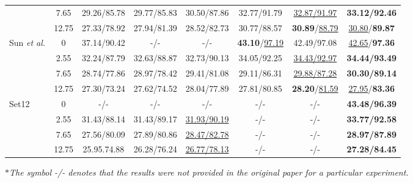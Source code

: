 \documentclass[10pt,journal,compsoc]{IEEEtran}
\newcommand\bdr[1]{{\textbf{#1}}}
\newcommand\bdb[1]{{\underline{#1}}}
\begin{document}
\begin{table}[t!]
\begin{tiny}
\begin{center}
\begin{tabular}{l c cccccc}
& 7.65 & 29.26/85.78  & 29.77/85.83 & 30.50/87.86 & 32.77/91.79 & \bdb{32.87/91.97} & \bdr{33.12/92.46} \\

& 12.75 & 27.33/78.92 & 27.94/81.39 & 28.52/82.73 & 30.77/88.57 & \bdr{30.89}/\bdb{88.79} & \bdb{30.80}/\bdr{89.87} \\

\hline


\multirow{4}{*}{Sun \textit{et al.}}

& 0    &  37.14/90.42  & -/- & -/- & \bdr{43.10}/\bdb{97.19}     & 42.49/97.08 &  \bdb{42.65}/\bdr{97.36} \\

& 2.55 & 32.24/87.79  & 32.63/88.87 & 32.73/90.13 & 34.05/92.25 & \bdb{34.43/92.97} & \bdr{34.44/93.49} \\

& 7.65 & 28.74/77.86  & 28.97/78.42 & 29.41/81.08 & 29.11/86.31     & \bdb{29.88/87.28} & \bdr{30.30/89.14} \\

& 12.75 & 27.30/73.24 & 27.62/74.52 & 28.04/77.89 & 27.81/80.85     & \bdr{28.20}/\bdb{81.59} & \bdb{27.95}/\bdr{83.36} \\

\hline


\multirow{4}{*}{Set12}

& 0     & -/-  & -/-  & -/-  & -/-  & -/-  &  \bdr{43.48/96.39} \\

& 2.55  & 31.43/88.14 & 31.43/89.17 & \bdb{31.93/90.19}  & -/-  & -/-  & \bdr{33.77/92.58}  \\

& 7.65  & 27.56/80.09 & 27.89/80.86 & \bdb{28.47/82.78} & -/-  & -/-  & \bdr{28.97/87.89} \\

& 12.75 & 25.95.74.88 & 26.28/76.24 & \bdb{26.77/78.13} & -/-  & -/-  & \bdr{27.28/84.45} \\

\hline


\end{tabular}\end{center}
\end{tiny}
\textit{$\ast$The symbol -/- denotes that the results were not provided in the original paper for a particular experiment.}
\end{table}
\end{document}
